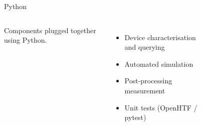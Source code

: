 \documentclass[10pt]{beamer}
\begin{document}
\begin{frame}{Python}

\begin{columns}


Components plugged together using Python.

\begin{itemize}
\item Device characterisation and querying
\item Automated simulation
\item Post-processing measurement
\item Unit tests (OpenHTF / pytest)
\end{itemize}

\begin{figure}[h]
\end{figure}

\end{columns}

\end{frame}


\end{document}
